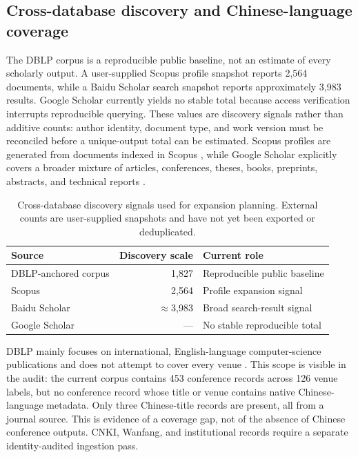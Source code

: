 \documentclass[11pt]{article}
\begin{document}
\subsection{Cross-database discovery and Chinese-language coverage}

The DBLP corpus is a reproducible public baseline, not an estimate of every
scholarly output. A user-supplied Scopus profile snapshot reports 2,564
documents, while a Baidu Scholar search snapshot reports approximately 3,983
results. Google Scholar currently yields no stable total because access
verification interrupts reproducible querying. These values are discovery
signals rather than additive counts: author identity, document type, and work
version must be reconciled before a unique-output total can be estimated.
Scopus profiles are generated from documents indexed in Scopus
\cite{scopus-author-profile}, while Google Scholar explicitly covers a broader
mixture of articles, conferences, theses, books, preprints, abstracts, and
technical reports \cite{google-scholar-scope}.

\begin{table}[ht]
\centering
\caption{Cross-database discovery signals used for expansion planning. External
counts are user-supplied snapshots and have not yet been exported or
deduplicated.}
\label{tab:cross-database}
\begin{tabular}{lrl}
\toprule
Source & Discovery scale & Current role \\
\midrule
DBLP-anchored corpus & 1,827 & Reproducible public baseline \\
Scopus & 2,564 & Profile expansion signal \\
Baidu Scholar & $\approx$3,983 & Broad search-result signal \\
Google Scholar & --- & No stable reproducible total \\
\bottomrule
\end{tabular}
\end{table}

DBLP mainly focuses on international, English-language computer-science
publications and does not attempt to cover every venue \cite{dblp-scope}. This
scope is visible in the audit: the current corpus contains 453 conference
records across 126 venue labels, but no conference record whose title or venue
contains native Chinese-language metadata. Only three Chinese-title records
are present, all from a journal source. This is evidence of a coverage gap, not
of the absence of Chinese conference outputs. CNKI, Wanfang, and institutional
records require a separate identity-audited ingestion pass.
\end{document}
